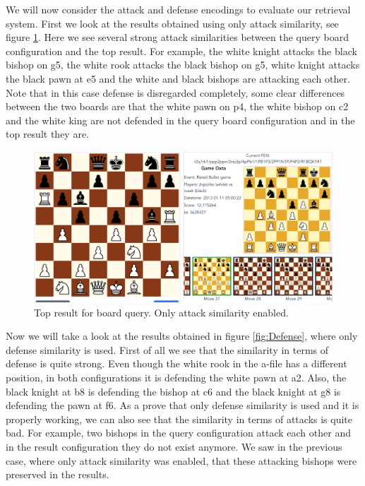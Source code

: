 \documentclass[11pt]{article}
\begin{document}
    We will now consider the attack and defense encodings to evaluate our retrieval system. First we look at the results obtained using only attack similarity, see figure \ref{fig:Attack}.
    Here we see several strong attack similarities between the query board configuration and the top result. For example, the white knight attacks the black bishop on g5, the white rook attacks the black bishop on g5, white knight attacks the black pawn at e5 and the white and black bishops are attacking each other.
    Note that in this case defense is disregarded completely, some clear differences between the two boards are that the white pawn on p4, the white bishop on c2 and the white king are not defended in the query board configuration and in the top result they are.

    \begin{figure}[H]
        \centering
        \includegraphics[width=14cm]{images/Attack}
        \caption{Top result for board query. Only attack similarity enabled.}
        \label{fig:Attack}
    \end{figure}

    Now we will take a look at the results obtained in figure \ref{fig:Defense}, where only defense similarity is used. First of all we see that the similarity in terms of defense is quite strong. Even though the white rook in the a-file has a different position, in both configurations it is defending the white pawn at a2. Also, the black knight at b8 is defending the bishop at c6 and the black knight at g8 is defending the pawn at f6. As a prove that only defense similarity is used and it is properly working, we can also see that the similarity in terms of attacks is quite bad. For example, two bishops in the query configuration attack each other and in the result configuration they do not exist anymore. We saw in the previous case, where only attack similarity was enabled, that these attacking bishops were preserved in the results.
\end{document}
